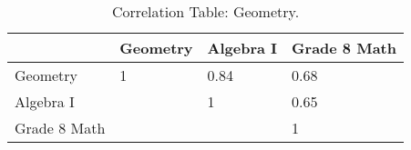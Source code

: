 \begin{table}[!tbp]
\caption{Correlation Table: Geometry.\label{}} 
\begin{center}
\begin{tabular}{llll}
\hline\hline
\multicolumn{1}{l}{}&\multicolumn{1}{c}{Geometry}&\multicolumn{1}{c}{Algebra I}&\multicolumn{1}{c}{Grade 8 Math}\tabularnewline
\hline
Geometry&1&0.84&0.68\tabularnewline
Algebra I&&1&0.65\tabularnewline
Grade 8 Math&&&1\tabularnewline
\hline
\end{tabular}\end{center}
\end{table}
